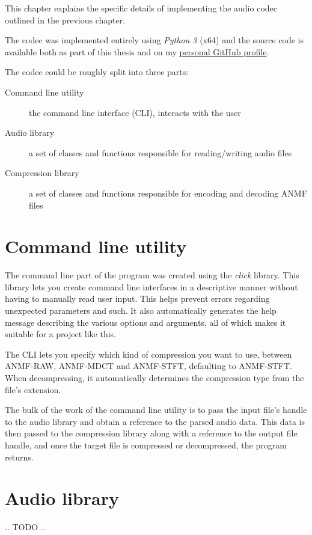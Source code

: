 This chapter explains the specific details of implementing the audio codec outlined in the previous chapter.

The codec was implemented entirely using \emph{Python 3} (x64) \cite{python3_ref} and the source code is available both as part of this thesis and on my \href{https://github.com/argoneuscze/AudioNMF}{personal GitHub profile}.

The codec could be roughly split into three parts:

\begin{description}
	\item[Command line utility] the command line interface (CLI), interacts with the user
	\item[Audio library] a set of classes and functions responsible for reading/writing audio files
	\item[Compression library] a set of classes and functions responsible for encoding and decoding ANMF files
\end{description}

\section{Command line utility}
The command line part of the program was created using the \emph{click} \cite{py_click} library. This library lets you create command line interfaces in a descriptive manner without having to manually read user input. This helps prevent errors regarding unexpected parameters and such. It also automatically generates the help message describing the various options and arguments, all of which makes it suitable for a project like this.

The CLI lets you specify which kind of compression you want to use, between ANMF-RAW, ANMF-MDCT and ANMF-STFT, defaulting to ANMF-STFT. When decompressing, it automatically determines the compression type from the file's extension.

The bulk of the work of the command line utility is to pass the input file's handle to the audio library and obtain a reference to the parsed audio data. This data is then passed to the compression library along with a reference to the output file handle, and once the target file is compressed or decompressed, the program returns.

\section{Audio library}
.. TODO ..

